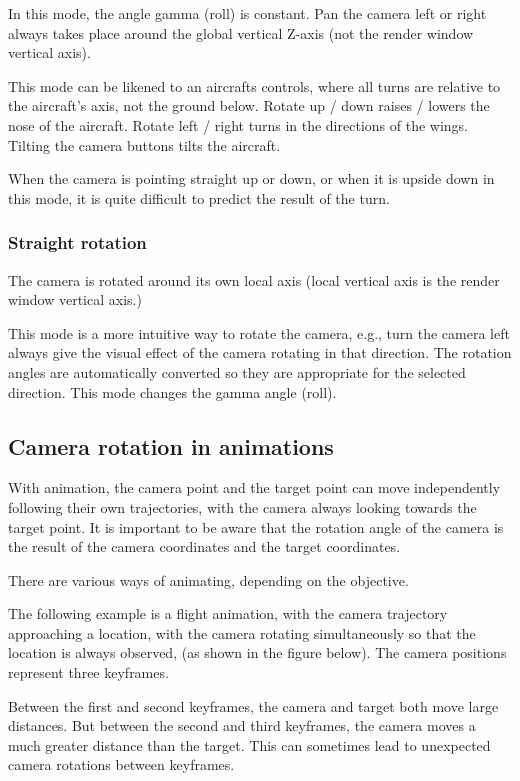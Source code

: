 In this mode, the angle gamma (roll) is constant. Pan the camera left or
right always takes place around the global vertical Z-axis (not the
render window vertical axis).

This mode can be likened to an aircrafts controls, where all turns are
relative to the aircraft's axis, not the ground below. Rotate up / down
raises / lowers the nose of the aircraft. Rotate left / right turns in
the directions of the wings. Tilting the camera buttons tilts the
aircraft.

When the camera is pointing straight up or down, or when it is upside
down in this mode, it is quite difficult to predict the result of the
turn.

\subsubsection{Straight rotation}\label{straight-rotation}

The camera is rotated around its own local axis (local vertical axis is
the render window vertical axis.)

This mode is a more intuitive way to rotate the camera, e.g., turn the
camera left always give the visual effect of the camera rotating in that
direction. The rotation angles are automatically converted so they are
appropriate for the selected direction. This mode changes the gamma
angle (roll).

\hypertarget{camera-rotation-in-animations}{\subsection{Camera rotation
in animations}\label{camera-rotation-in-animations}}

With animation, the camera point and the target point can move
independently following their own trajectories, with the camera always
looking towards the target point. It is important to be aware that the
rotation angle of the camera is the result of the camera coordinates and
the target coordinates.

There are various ways of animating, depending on the objective.

The following example is a flight animation, with the camera trajectory
approaching a location, with the camera rotating simultaneously so that
the location is always observed, (as shown in the figure below). The
camera positions represent three keyframes.

Between the first and second keyframes, the camera and target both move
large distances. But between the second and third keyframes, the camera
moves a much greater distance than the target. This can sometimes lead
to unexpected camera rotations between keyframes.

